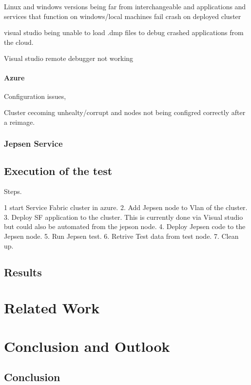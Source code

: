 \documentclass[a4paper,10pt,titlepage]{report}
\begin{document}
Linux and windows versions being far from interchangeable and applications and services that function on windows/local machines fail crash on deployed cluster

visual studio being unable to load .dmp files to debug crashed applications from the cloud.

Visual studio remote debugger not working

\subsubsection{Azure}

Configuration issues,

Cluster cecoming unhealty/corrupt and nodes not being configred correctly after a reimage.


\subsection{Jepsen Service}


\section{Execution of the test}

Steps.

1 start Service Fabric cluster in azure.
2. Add Jepsen node to Vlan of the cluster.
3. Deploy SF application to the cluster. This is currently done via Visual studio but could also be automated from the jepson node.
4. Deploy Jepsen code to the Jepsen node.
5. Run Jepsen test.
6. Retrive Test data from test node.
7. Clean up.


\section{Results}





\chapter{Related Work}

\chapter{Conclusion and Outlook}
\section*{Conclusion}
\end{document}
